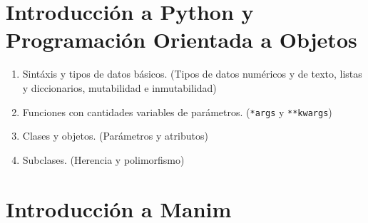 \documentclass[a4paper]{article}
\begin{document}
\setcounter{section}{-1}

\section{Introducción a Python y Programación Orientada a Objetos} \label{Sec: Introducción a Python y Programación Orientada a Objetos} 

\begin{enumerate}[label=\arabic*.]

    \item Sintáxis y tipos de datos básicos. (Tipos de datos numéricos y de texto, listas y diccionarios, mutabilidad e inmutabilidad)

    \item Funciones con cantidades variables de parámetros. (\texttt{*args} y \texttt{**kwargs})

    \item Clases y objetos. (Parámetros y atributos)

    \item Subclases. (Herencia y polimorfismo)
\end{enumerate}

\section{Introducción a Manim} \label{Sec: Introducción a Manim}
\end{document}
